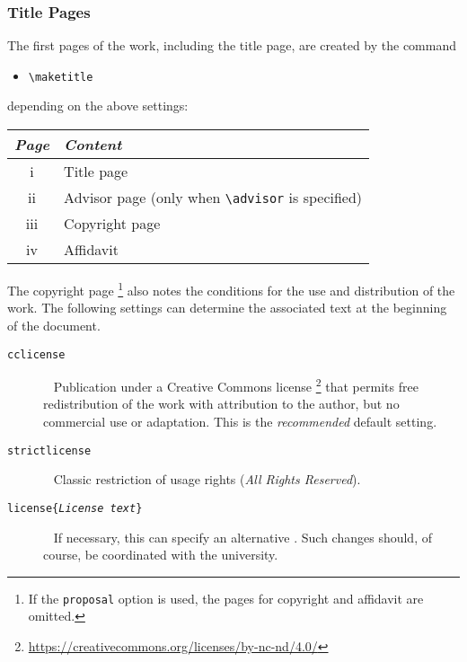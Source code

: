 \subsubsection{Title Pages}

The first pages of the work, including the title page, are created by the
command
%
\begin{itemize}
    \item[] \verb!\maketitle!
\end{itemize}
%
depending on the above settings:
%
\begin{center}
    \begin{tabular}{@{}cl@{}}
        \toprule
        \emph{Page} & \emph{Content} \\
        \midrule
        \textrm{i}   & Title page \\
        \textrm{ii}  & Advisor page (only when \verb!\advisor! is specified) \\
        \textrm{iii} & Copyright page \\
        \textrm{iv}  & Affidavit \\
        \bottomrule
    \end{tabular}
\end{center}
%
The copyright page%
\footnote{If the \texttt{proposal} option is used, the pages for copyright and
affidavit are omitted.}
also notes the conditions for the use and distribution of the work. The
following settings can determine the associated text at the beginning of the
document.
%
\begin{description}
    \item[\normalfont\texttt{{\bs}cclicense}] ~ \newline
    Publication under a Creative Commons license%
    \footnote{\url{https://creativecommons.org/licenses/by-nc-nd/4.0/}}
    that permits free redistribution of the work with attribution to the author,
    but no commercial use or adaptation. This is the \emph{recommended} default
    setting.
    \item[\normalfont\texttt{{\bs}strictlicense}] ~ \newline
    Classic restriction of usage rights (\emph{All Rights Reserved}).
    \item[\normalfont\texttt{{\bs}license\{\emph{License text}\}}] ~ \newline
    If necessary, this can specify an alternative .
    Such changes should, of course, be coordinated with the university.
\end{description}


